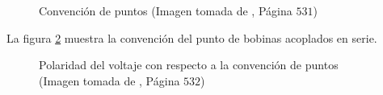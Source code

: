 \documentclass[twocolumn]{IEEEtran}
\begin{document}
\begin{figure}[H]
 \centering
  \hspace{0.5cm}
  \hspace{0.5cm}
  \hspace{0.5cm}
  \caption{Convención de puntos (Imagen tomada de \cite{sadiku}, Página $531$)}
    \label{fig5}
\end{figure}
\noindent
La figura \ref{fig6} muestra la convención del punto de bobinas acoplados en serie.
\begin{figure}[H]
 \centering
  \hspace{1cm}
  \caption{Polaridad del voltaje con respecto a la convención de puntos (Imagen tomada de \cite{sadiku}, Página $532$)}
    \label{fig6}
\end{figure}
\end{document}

